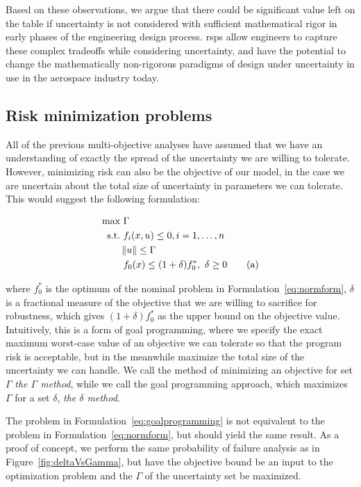 Based on these observations, we argue that there could be significant value left on the table
if uncertainty is not considered with sufficient mathematical rigor in early phases of
the engineering design process. \gls{rsp}s allow engineers to capture these complex
tradeoffs while considering uncertainty, and have the potential to change
the mathematically non-rigorous paradigms of design under uncertainty in use
in the aerospace industry today.

\subsection{Risk minimization problems}

All of the previous multi-objective analyses have assumed that we have an
understanding of exactly the spread of the uncertainty we are
willing to tolerate. However, minimizing risk can also be the objective of our
model, in the case we are uncertain about the total size of uncertainty in parameters
we can tolerate. This would suggest the following formulation:

\begin{align*}
    \text{max} &~\Gamma \\
    \text{s.t.}     &~f_i(x,u) \leq 0, i = 1,\ldots,n \\
                    & \left\lVert u\right\rVert \leq \Gamma \\
                    &~f_0(x) \leq (1+\delta)f_0^*,~\delta \geq 0 \tag{a}
    \label{eq:goalprogramming}
\end{align*}

where $f_0^*$ is the optimum of the nominal problem in Formulation~\ref{eq:normform}, $\delta$
is a fractional measure of the objective that we are willing to sacrifice for robustness, which
gives $(1+\delta)f_0^*$ as the upper bound on the objective value. Intuitively,
this is a form of goal programming,
where we specify the exact maximum worst-case value of an objective we can tolerate so that the program
risk is acceptable, but in the meanwhile maximize the total size of the uncertainty we can handle.
We call the method of minimizing an objective for set ${\Gamma}$ \emph{the $\Gamma$ method},
while we call the goal programming approach, which maximizes $\Gamma$ for a set $\delta$,
\emph{the $\delta$ method}.

The problem in Formulation~\ref{eq:goalprogramming} is not equivalent to the problem in Formulation~\ref{eq:normform},
but should yield the same result. As a proof of concept, we perform the same probability of failure
analysis as in Figure~\ref{fig:deltaVsGamma}, but have the objective bound be an input to the
optimization problem and the $\Gamma$ of the uncertainty set be maximized.

